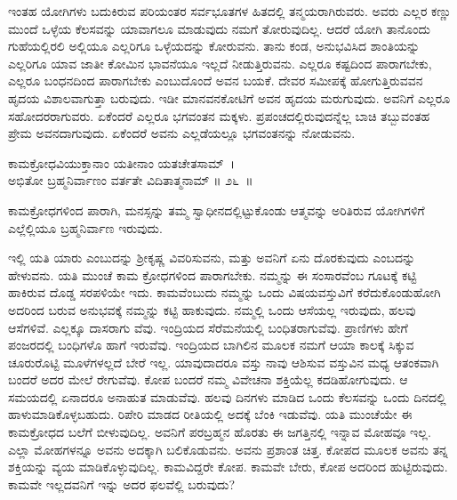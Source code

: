ಇಂತಹ ಯೋಗಿಗಳು ಬದುಕಿರುವ ಪರಿಯಂತರ ಸರ್ವಭೂತಗಳ ಹಿತದಲ್ಲಿ ತನ್ಮಯರಾಗಿರುವರು. ಅವರು ಎಲ್ಲರ ಕಣ್ಣು ಮುಂದೆ ಒಳ್ಳೆಯ ಕೆಲಸವನ್ನು ಯಾವಾಗಲೂ ಮಾಡುವುದು ನಮಗೆ ತೋರುವುದಿಲ್ಲ. ಆದರೆ ಯೋಗಿ ತಾನೊಂದು ಗುಹೆಯಲ್ಲಿರಲಿ ಅಲ್ಲಿಯೂ ಎಲ್ಲರಿಗೂ ಒಳ್ಳೆಯದನ್ನು ಕೋರುವನು. ತಾನು ಕಂಡ, ಅನುಭವಿಸಿದ ಶಾಂತಿಯನ್ನು ಎಲ್ಲರಿಗೂ ಯಾವ ಜಾತೀ ಕೋಮಿನ ಭಾವನೆಯೂ ಇಲ್ಲದೆ ನೀಡುತ್ತಿರುವನು. ಎಲ್ಲರೂ ಕಷ್ಟದಿಂದ ಪಾರಾಗಬೇಕು, ಎಲ್ಲರೂ ಬಂಧನದಿಂದ ಪಾರಾಗಬೇಕು ಎಂಬುದೊಂದೆ ಅವನ ಬಯಕೆ. ದೇವರ ಸಮೀಪಕ್ಕೆ ಹೋಗುತ್ತಿರುವವನ ಹೃದಯ ವಿಶಾಲವಾಗುತ್ತಾ ಬರುವುದು. ಇಡೀ ಮಾನವನಕೋಟಿಗೆ ಅವನ ಹೃದಯ ಮರುಗುವುದು. ಅವನಿಗೆ ಎಲ್ಲರೂ ಸಹೋದರರಾಗುವರು. ಏಕೆಂದರೆ ಎಲ್ಲರೂ ಭಗವಂತನ ಮಕ್ಕಳು. ಪ್ರಪಂಚದಲ್ಲಿರುವುದನ್ನೆಲ್ಲ ಬಾಚಿ ತಬ್ಬುವಂತಹ ಪ್ರೇಮ ಅವನದಾಗುವುದು. ಏಕೆಂದರೆ ಅವನು ಎಲ್ಲಡೆಯಲ್ಲೂ ಭಗವಂತನನ್ನು ನೋಡುವನು.

\begin{shloka}
ಕಾಮಕ್ರೋಧವಿಯುಕ್ತಾನಾಂ ಯತೀನಾಂ ಯತಚೇತಸಾಮ್~।\\ಅಭಿತೋ ಬ್ರಹ್ಮನಿರ್ವಾಣಂ ವರ್ತತೇ ವಿದಿತಾತ್ಮನಾಮ್ \hfill॥ ೨೬~॥
\end{shloka}

\begin{artha}
ಕಾಮಕ್ರೋಧಗಳಿಂದ ಪಾರಾಗಿ, ಮನಸ್ಸನ್ನು ತಮ್ಮ ಸ್ವಾಧೀನದಲ್ಲಿಟ್ಟುಕೊಂಡು ಆತ್ಮವನ್ನು ಅರಿತಿರುವ ಯೋಗಿಗಳಿಗೆ ಎಲ್ಲೆಲ್ಲಿಯೂ ಬ್ರಹ್ಮನಿರ್ವಾಣ ಇರುವುದು.
\end{artha}

ಇಲ್ಲಿ ಯತಿ ಯಾರು ಎಂಬುದನ್ನು ಶ‍್ರೀಕೃಷ್ಣ ವಿವರಿಸುವನು, ಮತ್ತು ಅವನಿಗೆ ಏನು ದೊರಕುವುದು ಎಂಬದನ್ನು ಹೇಳುವನು. ಯತಿ ಮುಂಚೆ ಕಾಮ ಕ್ರೋಧಗಳಿಂದ ಪಾರಾಗಬೇಕು. ನಮ್ಮನ್ನು ಈ ಸಂಸಾರವೆಂಬ ಗೂಟಕ್ಕೆ ಕಟ್ಟಿ ಹಾಕಿರುವ ದೊಡ್ಡ ಸರಪಳಿಯೇ ಇದು. ಕಾಮವೆಂಬುದು ನಮ್ಮನ್ನು ಒಂದು ವಿಷಯವಸ್ತುವಿಗೆ ಕರೆದುಕೊಂಡುಹೋಗಿ ಅದರಿಂದ ಬರುವ ಅನುಭವಕ್ಕೆ ನಮ್ಮನ್ನು ಕಟ್ಟಿ ಹಾಕುವುದು. ನಮ್ಮಲ್ಲಿ ಒಂದು ಆಸೆಯಲ್ಲ ಇರುವುದು, ಹಲವು ಆಸೆಗಳಿವೆ. ಎಲ್ಲಕ್ಕೂ ದಾಸರಾಗು ವೆವು. ಇಂದ್ರಿಯದ ಸೆರೆಮನೆಯಲ್ಲಿ ಬಂಧಿತರಾಗುವೆವು. ಪ್ರಾಣಿಗಳು ಹೇಗೆ ಪಂಜರದಲ್ಲಿ ಬಂಧಿಗಳೊ ಹಾಗೆ ಇರುವೆವು. ಇಂದ್ರಿಯದ ಬಾಗಿಲಿನ ಮೂಲಕ ನಮಗೆ ಆಯಾ ಕಾಲಕ್ಕೆ ಸಿಕ್ಕುವ ಚೂರುರೊಟ್ಟಿ ಮೂಳೆಗಳಲ್ಲದೆ ಬೇರೆ ಇಲ್ಲ. ಯಾವುದಾದರೂ ವಸ್ತು ನಾವು ಆಶಿಸುವ ವಸ್ತುವಿನ ಮಧ್ಯ ಆತಂಕವಾಗಿ ಬಂದರೆ ಅದರ ಮೇಲೆ ರೇಗುವೆವು. ಕೋಪ ಬಂದರೆ ನಮ್ಮ ವಿವೇಚನಾ ಶಕ್ತಿಯೆಲ್ಲ ಕದಡಿಹೋಗುವುದು. ಆ ಸಮಯದಲ್ಲಿ ಏನಾದರೂ ಅನಾಹುತ ಮಾಡುವೆವು. ಹಲವು ದಿನಗಳು ಮಾಡಿದ ಒಂದು ಕೆಲಸವನ್ನು ಒಂದು ದಿನದಲ್ಲಿ ಹಾಳು\-ಮಾಡಿಕೊಳ್ಳಬಹುದು. ರಿಪೇರಿ ಮಾಡದ ರೀತಿಯಲ್ಲಿ ಅದಕ್ಕೆ ಬೆಂಕಿ ಇಡುವೆವು. ಯತಿ ಮುಂಚೆಯೇ ಈ ಕಾಮಕ್ರೋಧದ ಬಲೆಗೆ ಬೀಳುವುದಿಲ್ಲ. ಅವನಿಗೆ ಪರಬ್ರಹ್ಮನ ಹೊರತು ಈ ಜಗತ್ತಿನಲ್ಲಿ ಇನ್ನಾವ ಮೋಹವೂ ಇಲ್ಲ. ಎಲ್ಲಾ ಮೋಹಗಳನ್ನೂ ಅವನು ಅದಕ್ಕಾಗಿ ಬಲಿಕೊಡುವನು. ಅವನು ಪ್ರಶಾಂತ ಚಿತ್ತ. ಕೋಪದ ಮೂಲಕ ಅವನು ತನ್ನ ಶಕ್ತಿಯನ್ನು ವ್ಯಯ ಮಾಡಿಕೊಳ್ಳುವುದಿಲ್ಲ. ಕಾಮವಿದ್ದರೇ ಕೋಪ. ಕಾಮವೇ ಬೇರು, ಕೋಪ ಅದರಿಂದ ಹುಟ್ಟಿರುವುದು. ಕಾಮವೇ ಇಲ್ಲದವನಿಗೆ ಇನ್ನು ಅದರ ಫಲವೆಲ್ಲಿ ಬರುವುದು?

